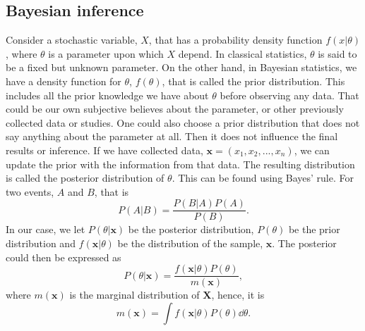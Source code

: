 \subsection{Bayesian inference}
Consider a stochastic variable, $X$, that has a probability density function $f(x|\theta)$, where $\theta$ is a parameter upon which $X$ depend. In classical statistics, $\theta$ is said to be a fixed but unknown parameter. On the other hand, in Bayesian statistics, we have a density function for $\theta$, $f(\theta)$, that is called the prior distribution. This includes all the prior knowledge we have about $\theta$ before observing any data. That could be our own subjective believes about the parameter, or other previously collected data or studies. One could also choose a prior distribution that does not say anything about the parameter at all. Then it does not influence the final results or inference. 
If we have collected data, $\textbf{x} = (x_1,x_2,...,x_n)$, we can update the prior with the information from that data. The resulting distribution is called the posterior distribution of $\theta$. This can be found using Bayes' rule. For two events, $A$ and $B$, that is
\begin{equation*}
    P(A|B)=\frac{P(B|A)P(A)}{P(B)}.
\end{equation*}%
In our case, we let $P(\theta|\textbf{x})$ be the posterior distribution, $P(\theta)$ be the prior distribution and $f(\textbf{x}|\theta)$ be the distribution of the sample, $\textbf{x}$. The posterior could then be expressed as
\begin{equation*}
    P(\theta|\textbf{x}) = \frac{f(\textbf{x}|\theta)P(\theta)}{m(\textbf{x})},
\end{equation*}
where $m(\textbf{x})$ is the marginal distribution of $\textbf{X}$, hence, it is
\begin{equation*}
    m(\textbf{x}) = \int f(\textbf{x}|\theta) P(\theta) \dd \theta.
\end{equation*}
